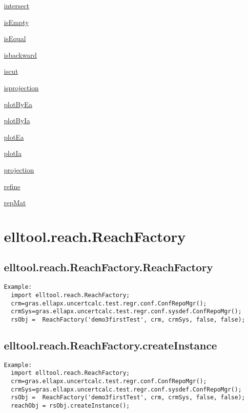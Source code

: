 \begin{list}{}{}
 \item \hyperref[method:elltool.reach.AReach.intersect]{intersect}
 \item \hyperref[method:elltool.reach.AReach.isEmpty]{isEmpty}
 \item \hyperref[method:elltool.reach.AReach.isEqual]{isEqual}
 \item \hyperref[method:elltool.reach.AReach.isbackward]{isbackward}
 \item \hyperref[method:elltool.reach.AReach.iscut]{iscut}
 \item \hyperref[method:elltool.reach.AReach.isprojection]{isprojection}
 \item \hyperref[method:elltool.reach.AReach.plotByEa]{plotByEa}
 \item \hyperref[method:elltool.reach.AReach.plotByIa]{plotByIa}
 \item \hyperref[method:elltool.reach.AReach.plotEa]{plotEa}
 \item \hyperref[method:elltool.reach.AReach.plotIa]{plotIa}
 \item \hyperref[method:elltool.reach.AReach.projection]{projection}
 \item \hyperref[method:elltool.reach.AReach.refine]{refine}
 \item \hyperref[method:elltool.reach.AReach.repMat]{repMat}
\end{list}
\section{elltool.reach.ReachFactory}\label{secClassDescr:elltool.reach.ReachFactory}
\subsection{\texorpdfstring{elltool.reach.ReachFactory.ReachFactory}{ReachFactory}}\label{method:elltool.reach.ReachFactory.ReachFactory}
\begin{verbatim}
Example:
  import elltool.reach.ReachFactory;
  crm=gras.ellapx.uncertcalc.test.regr.conf.ConfRepoMgr();
  crmSys=gras.ellapx.uncertcalc.test.regr.conf.sysdef.ConfRepoMgr();
  rsObj =  ReachFactory('demo3firstTest', crm, crmSys, false, false);
\end{verbatim}
\subsection{\texorpdfstring{elltool.reach.ReachFactory.createInstance}{createInstance}}\label{method:elltool.reach.ReachFactory.createInstance}
\begin{verbatim}
Example:
  import elltool.reach.ReachFactory;
  crm=gras.ellapx.uncertcalc.test.regr.conf.ConfRepoMgr();
  crmSys=gras.ellapx.uncertcalc.test.regr.conf.sysdef.ConfRepoMgr();
  rsObj =  ReachFactory('demo3firstTest', crm, crmSys, false, false);
  reachObj = rsObj.createInstance();
\end{verbatim}
